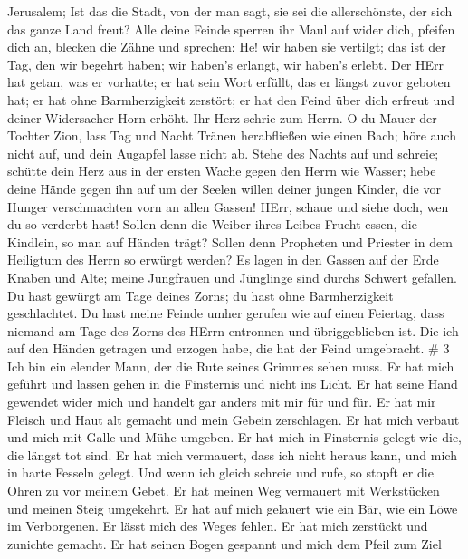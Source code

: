 Jerusalem; Ist das die Stadt, von der man sagt, sie sei die
allerschönste, der sich das ganze Land freut?  Alle deine
Feinde sperren ihr Maul auf wider dich, pfeifen dich an, blecken die
Zähne und sprechen: He! wir haben sie vertilgt; das ist der Tag, den wir
begehrt haben; wir haben's erlangt, wir haben's erlebt. 
Der HErr hat getan, was er vorhatte; er hat sein Wort erfüllt, das er
längst zuvor geboten hat; er hat ohne Barmherzigkeit zerstört; er hat
den Feind über dich erfreut und deiner Widersacher Horn erhöht.
 Ihr Herz schrie zum Herrn. O du Mauer der Tochter Zion,
lass Tag und Nacht Tränen herabfließen wie einen Bach; höre auch nicht
auf, und dein Augapfel lasse nicht ab.  Stehe des Nachts
auf und schreie; schütte dein Herz aus in der ersten Wache gegen den
Herrn wie Wasser; hebe deine Hände gegen ihn auf um der Seelen willen
deiner jungen Kinder, die vor Hunger verschmachten vorn an allen Gassen!
 HErr, schaue und siehe doch, wen du so verderbt hast!
Sollen denn die Weiber ihres Leibes Frucht essen, die Kindlein, so man
auf Händen trägt? Sollen denn Propheten und Priester in dem Heiligtum
des Herrn so erwürgt werden?  Es lagen in den Gassen auf
der Erde Knaben und Alte; meine Jungfrauen und Jünglinge sind durchs
Schwert gefallen. Du hast gewürgt am Tage deines Zorns; du hast ohne
Barmherzigkeit geschlachtet.  Du hast meine Feinde umher
gerufen wie auf einen Feiertag, dass niemand am Tage des Zorns des HErrn
entronnen und übriggeblieben ist. Die ich auf den Händen getragen und
erzogen habe, die hat der Feind umgebracht. \# 3  Ich bin
ein elender Mann, der die Rute seines Grimmes sehen muss. 
Er hat mich geführt und lassen gehen in die Finsternis und nicht ins
Licht.  Er hat seine Hand gewendet wider mich und handelt
gar anders mit mir für und für.  Er hat mir Fleisch und Haut
alt gemacht und mein Gebein zerschlagen.  Er hat mich
verbaut und mich mit Galle und Mühe umgeben.  Er hat mich in
Finsternis gelegt wie die, die längst tot sind.  Er hat mich
vermauert, dass ich nicht heraus kann, und mich in harte Fesseln gelegt.
 Und wenn ich gleich schreie und rufe, so stopft er die
Ohren zu vor meinem Gebet.  Er hat meinen Weg vermauert mit
Werkstücken und meinen Steig umgekehrt.  Er hat auf mich
gelauert wie ein Bär, wie ein Löwe im Verborgenen.  Er
lässt mich des Weges fehlen. Er hat mich zerstückt und zunichte gemacht.
 Er hat seinen Bogen gespannt und mich dem Pfeil zum Ziel
